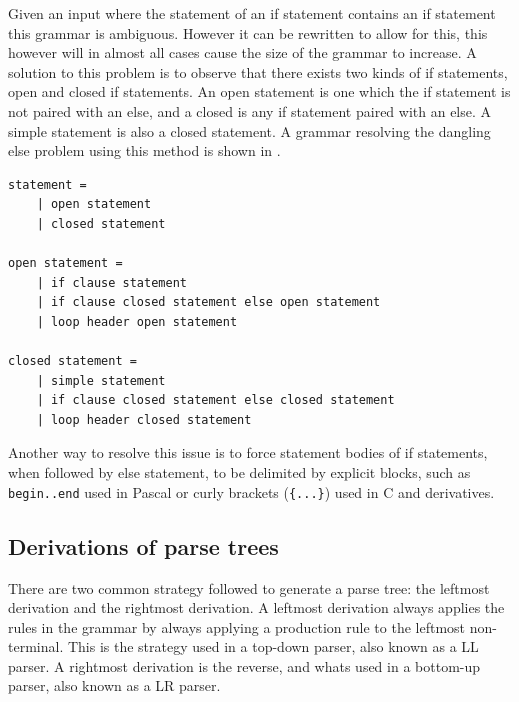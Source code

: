 Given an input where the statement of an if statement contains an if statement this grammar is ambiguous.  
However it can be rewritten to allow for this, this however will in almost all cases cause the size of the grammar to increase. 
A solution to this problem is to observe that there exists two kinds of if statements, open and closed if statements.
An open statement is one which the if statement is not paired with an else, and a closed is any if statement paired with an else.
A simple statement is also a closed statement.
A grammar resolving the dangling else problem using this method is shown in .

\begin{lstlisting}[caption={An example of a \acrshort{cfg} describing an if statement, that is not ambiguous. \citep{danglingelse}},frame=tlrb,label={lst:danglingelseex2},numbers=none]
statement =
    | open statement
    | closed statement

open statement =
    | if clause statement
    | if clause closed statement else open statement
    | loop header open statement

closed statement =
    | simple statement
    | if clause closed statement else closed statement
    | loop header closed statement
\end{lstlisting}

Another way to resolve this issue is to force statement bodies of if statements, when followed by else statement, to be delimited by explicit blocks, such as \texttt{begin..end} used in Pascal or curly brackets (\texttt{\{...\}}) used in C and derivatives. 

\subsection{Derivations of parse trees}

There are two common strategy followed to generate a parse tree: the leftmost derivation and the rightmost derivation. 
A leftmost derivation always applies the rules in the grammar by always applying a production rule to the leftmost non-terminal. 
This is the strategy used in a top-down parser, also known as a LL parser.
A rightmost derivation is the reverse, and whats used in a bottom-up parser, also known as a LR parser. 

